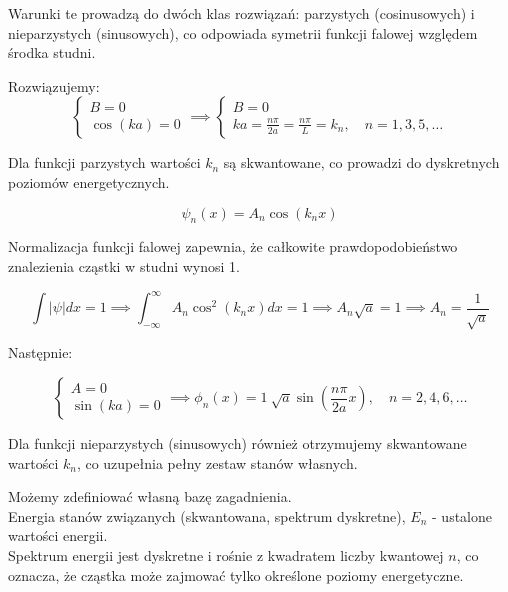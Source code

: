 Warunki te prowadzą do dwóch klas rozwiązań: parzystych (cosinusowych) i nieparzystych (sinusowych),
co odpowiada symetrii funkcji falowej względem środka studni.

Rozwiązujemy:
\begin{equation*}
    \begin{cases}
        B = 0 \\
        \cos(ka) = 0
    \end{cases}
    \implies
    \begin{cases}
        B = 0 \\
        ka = \frac{n \pi}{2 a} = \frac{n \pi}{L} = k_n, \quad n = 1, 3, 5, \ldots
    \end{cases}
\end{equation*}

Dla funkcji parzystych wartości $k_n$ są skwantowane, co prowadzi do dyskretnych poziomów energetycznych.


\begin{equation*}
    \psi_n(x) = A_n \cos(k_n x)
\end{equation*}

Normalizacja funkcji falowej zapewnia, że całkowite prawdopodobieństwo znalezienia cząstki w studni wynosi 1.

\begin{equation*}
    \int |\psi| dx = 1 \implies \int_{-\infty}^{\infty} A_n \cos^2 (k_n x) dx = 1 \implies A_n \sqrt{a} = 1 \implies A_n = \frac{1}{\sqrt{a}}
\end{equation*}


Następnie:

\begin{equation*}
    \begin{cases}
        A = 0 \\
        \sin(ka) = 0
    \end{cases}
    \implies
    \phi_n(x) = 1 \ \sqrt{a} \sin(\frac{n \pi}{2a} x), \quad n = 2, 4, 6, \ldots
\end{equation*}

Dla funkcji nieparzystych (sinusowych) również otrzymujemy skwantowane wartości $k_n$, co uzupełnia pełny zestaw stanów własnych.

Możemy zdefiniować własną bazę zagadnienia. \\
Energia stanów związanych (skwantowana, spektrum dyskretne), $E_n$ - ustalone wartości energii. \\

Spektrum energii jest dyskretne i rośnie z kwadratem liczby kwantowej $n$, co oznacza,
że cząstka może zajmować tylko określone poziomy energetyczne.

